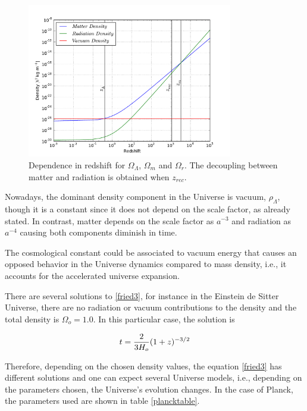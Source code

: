 \begin{figure}[htbp]
       \centering
               \includegraphics[width=0.8\textwidth]{Images/chapter2/density.pdf}
       \caption{ \small Dependence in redshift for $\Omega_\Lambda$, $\Omega_m$ and
       $\Omega_r$. The decoupling between matter and radiation is obtained when 
       $z_{rec}$.
        }
       \label{densidad}
 \end{figure}

Nowadays, the dominant density component in the Universe is vacuum, $\rho_{\Lambda}$, 
though it is a constant since it does not depend on the scale factor, as already
stated. In contrast, matter depends on the scale factor as $a^{-3}$ and radiation as 
$a^{-4}$ causing both components diminish in time. 

The cosmological constant could be associated to vacuum energy that causes an
opposed behavior in the Universe dynamics compared to mass density, i.e., 
it accounts for the accelerated universe expansion. 

There are several solutions to \ref{fried3}, for instance in the Einstein de 
Sitter Universe, there are no radiation or vacuum contributions to the density
and the total density is $\Omega_o=1.0$. In this particular case, the solution
is

\[
t = \frac{2}{3H_o}(1+z)^{-3/2}
\]

Therefore, depending on the chosen density values, the equation \ref{fried3}
has different solutions and one can expect several Universe models, i.e.,
depending on the parameters chosen, the Universe's evolution changes.  
In the case of Planck, the parameters used are shown in table \ref{plancktable}. 

